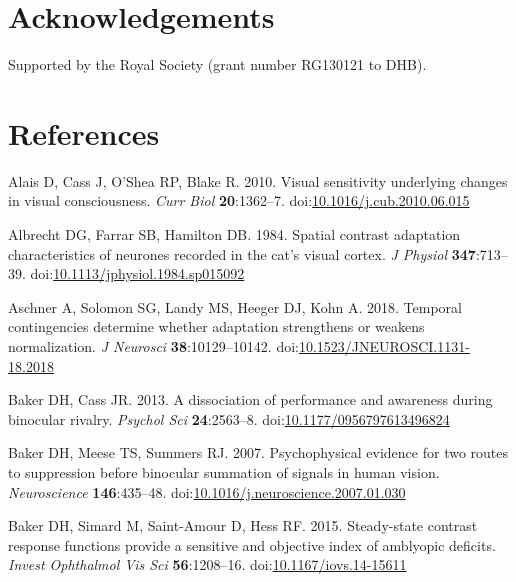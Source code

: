 \documentclass[]{article}
\begin{document}
\hypertarget{acknowledgements}{%
\section{Acknowledgements}\label{acknowledgements}}

Supported by the Royal Society (grant number RG130121 to DHB).

\hypertarget{references}{%
\section*{References}\label{references}}

\hypertarget{refs}{}
\leavevmode\hypertarget{ref-Alais2010}{}%
Alais D, Cass J, O'Shea RP, Blake R. 2010. Visual sensitivity underlying changes in visual consciousness. \emph{Curr Biol} \textbf{20}:1362--7. doi:\href{https://doi.org/10.1016/j.cub.2010.06.015}{10.1016/j.cub.2010.06.015}

\leavevmode\hypertarget{ref-Albrecht1984}{}%
Albrecht DG, Farrar SB, Hamilton DB. 1984. Spatial contrast adaptation characteristics of neurones recorded in the cat's visual cortex. \emph{J Physiol} \textbf{347}:713--39. doi:\href{https://doi.org/10.1113/jphysiol.1984.sp015092}{10.1113/jphysiol.1984.sp015092}

\leavevmode\hypertarget{ref-Aschner2018}{}%
Aschner A, Solomon SG, Landy MS, Heeger DJ, Kohn A. 2018. Temporal contingencies determine whether adaptation strengthens or weakens normalization. \emph{J Neurosci} \textbf{38}:10129--10142. doi:\href{https://doi.org/10.1523/JNEUROSCI.1131-18.2018}{10.1523/JNEUROSCI.1131-18.2018}

\leavevmode\hypertarget{ref-Baker2013}{}%
Baker DH, Cass JR. 2013. A dissociation of performance and awareness during binocular rivalry. \emph{Psychol Sci} \textbf{24}:2563--8. doi:\href{https://doi.org/10.1177/0956797613496824}{10.1177/0956797613496824}

\leavevmode\hypertarget{ref-Baker2007}{}%
Baker DH, Meese TS, Summers RJ. 2007. Psychophysical evidence for two routes to suppression before binocular summation of signals in human vision. \emph{Neuroscience} \textbf{146}:435--48. doi:\href{https://doi.org/10.1016/j.neuroscience.2007.01.030}{10.1016/j.neuroscience.2007.01.030}

\leavevmode\hypertarget{ref-Baker2015}{}%
Baker DH, Simard M, Saint-Amour D, Hess RF. 2015. Steady-state contrast response functions provide a sensitive and objective index of amblyopic deficits. \emph{Invest Ophthalmol Vis Sci} \textbf{56}:1208--16. doi:\href{https://doi.org/10.1167/iovs.14-15611}{10.1167/iovs.14-15611}
\end{document}
